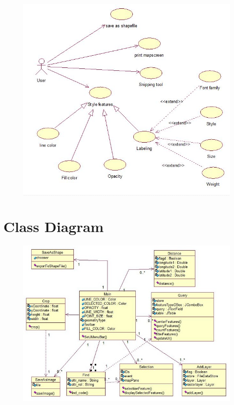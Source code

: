 \begin{figure}[h]
\begin{center}
  \includegraphics {Print.jpg}
\end{center}
\end{figure}

\section{Class Diagram}
\begin{figure}[h]
\begin{center}
  \includegraphics {Class.jpg}
\end{center}
\end{figure}

